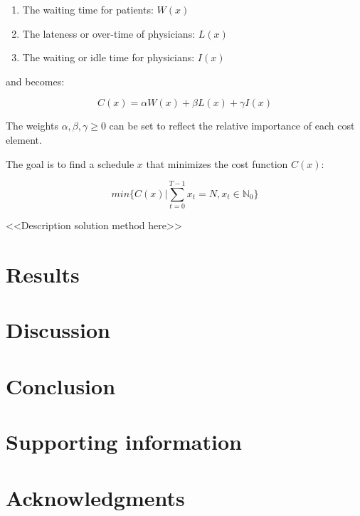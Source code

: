 \documentclass[
  10pt,
  letterpaper,
]{article}
\providecommand{\tightlist}{%
  \setlength{\itemsep}{0pt}\setlength{\parskip}{0pt}}\usepackage{longtable,booktabs,array}
\begin{document}
\begin{enumerate}
\def\labelenumi{\arabic{enumi}.}
\tightlist
\item
  The waiting time for patients: \(W(x)\)
\item
  The lateness or over-time of physicians: \(L(x)\)
\item
  The waiting or idle time for physicians: \(I(x)\)
\end{enumerate}

and becomes:

\[
C(x) = \alpha W(x) + \beta L(x) + \gamma I(x)
\]

The weights \(\alpha, \beta,\gamma \geq0\) can be set to reflect the
relative importance of each cost element.

The goal is to find a schedule \(x\) that minimizes the cost function
\(C(x)\):

\[
min\{C(x)|\displaystyle\sum_{t=0} ^{T-1} x_t = N, x_t \in \mathbb{N}_0\}
\]

\textless\textless Description solution method
here\textgreater\textgreater{}

\hypertarget{results}{%
\section{Results}\label{results}}

\hypertarget{discussion}{%
\section{Discussion}\label{discussion}}

\hypertarget{conclusion}{%
\section{Conclusion}\label{conclusion}}

\hypertarget{supporting-information}{%
\section{Supporting information}\label{supporting-information}}

\hypertarget{acknowledgments}{%
\section{Acknowledgments}\label{acknowledgments}}


\nolinenumbers
\renewcommand\refname{References}
  
\end{document}
